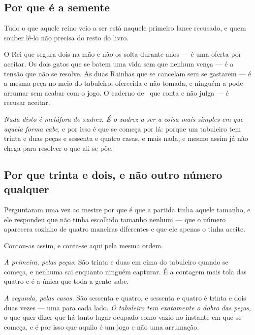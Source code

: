 \documentclass[livro.tex]{subfiles}
\begin{document}
\subsection*{Por que é a semente}

Tudo o que aquele reino veio a ser está naquele primeiro lance recusado, e quem souber lê-lo não
precisa do resto do livro.

\medskip

O Rei que segura dois na mão e não os solta durante anos --- é uma oferta por aceitar. Os dois
gatos que se batem uma vida sem que nenhum vença --- é a tensão que não se resolve. As duas
Rainhas que se cancelam sem se gastarem --- é a mesma peça no meio do tabuleiro, oferecida e não
tomada, e ninguém a pode arrumar sem acabar com o jogo. O caderno de \Joa\ que conta e não julga
--- é recusar aceitar.

\medskip

\emph{Nada disto é metáfora do xadrez. É o xadrez a ser a coisa mais simples em que aquela forma
cabe}, e por isso é que se começa por lá: porque um tabuleiro tem trinta e duas peças e sessenta e
quatro casas, e mais nada, e mesmo assim já não chega para resolver o que ali se põe.



\subsection*{Por que trinta e dois, e não outro número qualquer}

Perguntaram uma vez ao mestre por que é que a partida tinha aquele tamanho, e ele respondeu que
não tinha escolhido tamanho nenhum --- que o número aparecera sozinho de quatro maneiras
diferentes e que ele apenas o tinha aceite.

\medskip

Contou-as assim, e conta-se aqui pela mesma ordem.

\medskip

\emph{A primeira, pelas peças.} São trinta e duas em cima do tabuleiro quando se começa, e nenhuma
sai enquanto ninguém capturar. É a contagem mais tola das quatro e é a única que toda a gente sabe.

\medskip

\emph{A segunda, pelas casas.} São sessenta e quatro, e sessenta e quatro é trinta e dois duas
vezes --- uma para cada lado. \emph{O tabuleiro tem exatamente o dobro das peças}, o que quer dizer
que há tanto lugar ocupado como vazio no instante em que se começa, e é por isso que aquilo é um
jogo e não uma arrumação.
\end{document}
